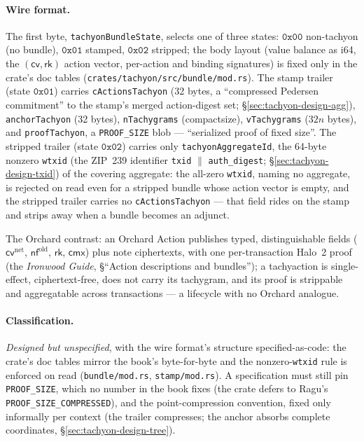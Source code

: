 \documentclass[11pt,a4paper]{article}
\theoremstyle{definition}
\newcommand{\nfsym}{\mathsf{nf}}
\newcommand{\cmx}{\mathsf{cmx}}
\newcommand{\cvsym}{\mathsf{cv}}
\newcommand{\rk}{\mathsf{rk}}
\begin{document}
\paragraph{Wire format.} The first byte, \texttt{tachyonBundleState},
selects one of three states: $\mathtt{0x00}$ non-tachyon (no bundle),
$\mathtt{0x01}$ stamped, $\mathtt{0x02}$ stripped; the body layout (value
balance as i64, the $(\cvsym, \rk)$ action vector, per-action and binding
signatures) is fixed only in the crate's doc tables
(\texttt{crates/tachyon/src/bundle/mod.rs}). The stamp trailer (state
$\mathtt{0x01}$) carries \texttt{cActionsTachyon} (32 bytes, a
``compressed Pedersen commitment'' to the stamp's merged action-digest
set; \S\ref{sec:tachyon-design-agg}), \texttt{anchorTachyon} (32 bytes),
\texttt{nTachygrams} (compactsize), \texttt{vTachygrams} ($32n$ bytes),
and \texttt{proofTachyon}, a \texttt{PROOF\_SIZE} blob --- ``serialized
proof of fixed size''. The stripped trailer (state $\mathtt{0x02}$)
carries only \texttt{tachyonAggregateId}, the 64-byte nonzero
\texttt{wtxid} (the ZIP~239 identifier \texttt{txid} $\|$
\texttt{auth\_digest}; \S\ref{sec:tachyon-design-txid}) of the covering
aggregate: the all-zero \texttt{wtxid},
naming no aggregate, is rejected on read even for a stripped bundle
whose action vector is empty, and
the stripped trailer carries no \texttt{cActionsTachyon} --- that field
rides on the stamp and strips away when a bundle becomes an adjunct.

The Orchard contrast: an Orchard Action publishes typed, distinguishable
fields ($\cvsym^{\mathrm{net}}$, $\nfsym^{\mathrm{old}}$, $\rk$, $\cmx$)
plus note ciphertexts, with one per-transaction Halo~2 proof (the
\emph{Ironwood Guide}, \S``Action descriptions and bundles''); a tachyaction
is single-effect, ciphertext-free, does not carry its tachygram, and its
proof is strippable and aggregatable across
transactions --- a lifecycle with no Orchard analogue.

\paragraph{Classification.} \emph{Designed but unspecified}, with the wire
format's structure specified-as-code: the crate's doc tables mirror the
book's byte-for-byte and the nonzero-\texttt{wtxid} rule is enforced on
read (\texttt{bundle/mod.rs}, \texttt{stamp/mod.rs}). A specification must
still pin \texttt{PROOF\_SIZE}, which no number in the book fixes (the
crate defers to Ragu's \texttt{PROOF\_SIZE\_COMPRESSED}), and the
point-compression convention, fixed only informally per context (the
trailer compresses; the anchor absorbs complete coordinates,
\S\ref{sec:tachyon-design-tree}).
\end{document}
